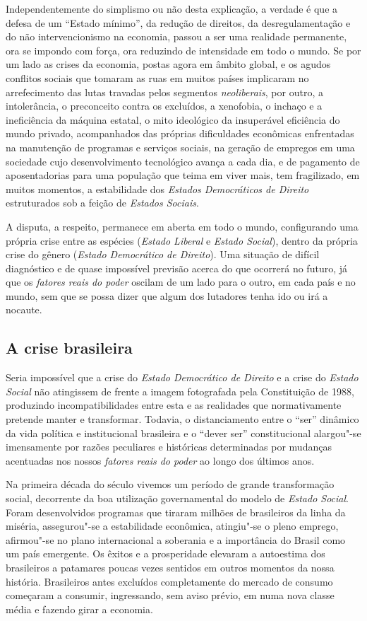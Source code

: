 Independentemente do simplismo ou não desta explicação, a verdade é que
a defesa de um ``Estado mínimo'', da redução de direitos, da
desregulamentação e do não intervencionismo na economia, passou a ser
uma realidade permanente, ora se impondo com força, ora reduzindo de
intensidade em todo o mundo. Se por um lado as crises da economia,
postas agora em âmbito global, e os agudos conflitos sociais que tomaram
as ruas em muitos países implicaram no arrefecimento das lutas travadas
pelos segmentos \emph{neoliberais}, por outro, a intolerância, o
preconceito contra os excluídos, a xenofobia, o inchaço e a ineficiência
da máquina estatal, o mito ideológico da insuperável eficiência do mundo
privado, acompanhados das próprias dificuldades econômicas enfrentadas
na manutenção de programas e serviços sociais, na geração de empregos em
uma sociedade cujo desenvolvimento tecnológico avança a cada dia, e de
pagamento de aposentadorias para uma população que teima em viver mais,
tem fragilizado, em muitos momentos, a estabilidade dos \emph{Estados
Democráticos de Direito} estruturados sob a feição de \emph{Estados
Sociais}.

A disputa, a respeito, permanece em aberta em todo o mundo, configurando
uma própria crise entre as espécies (\emph{Estado Liberal} e
\emph{Estado Social}), dentro da própria crise do gênero (\emph{Estado
Democrático de Direito}). Uma situação de difícil diagnóstico e de quase
impossível previsão acerca do que ocorrerá no futuro, já que os
\emph{fatores reais do poder} oscilam de um lado para o outro, em
cada país e no mundo, sem que se possa dizer que algum dos lutadores
tenha ido ou irá a nocaute.

\subsection{A crise brasileira}

Seria impossível que a crise do \emph{Estado Democrático de Direito} e a
crise do \emph{Estado Social} não atingissem de frente a imagem
fotografada pela Constituição de 1988, produzindo incompatibilidades
entre esta e as realidades que normativamente pretende manter e
transformar. Todavia, o distanciamento entre o ``ser'' dinâmico
da vida política e institucional brasileira e o ``dever ser''
constitucional alargou"-se imensamente por razões peculiares e históricas
determinadas por mudanças acentuadas nos nossos \emph{fatores reais do
poder} ao longo dos últimos anos.

Na primeira década do século  vivemos um período de grande
transformação social, decorrente da boa utilização governamental do
modelo de \emph{Estado Social}. Foram desenvolvidos programas que
tiraram milhões de brasileiros da linha da miséria, assegurou"-se a
estabilidade econômica, atingiu"-se o pleno emprego, afirmou"-se no plano
internacional a soberania e a importância do Brasil como um país
emergente. Os êxitos e a prosperidade elevaram a autoestima dos
brasileiros a patamares poucas vezes sentidos em outros momentos da
nossa história. Brasileiros antes excluídos completamente do mercado de
consumo começaram a consumir, ingressando, sem aviso prévio, em numa
nova classe média e fazendo girar a economia.

